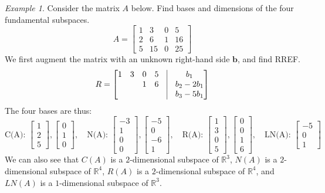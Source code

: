 \documentclass[11pt,oneside]{amsbook}
\newcommand{\R}{\mathbb R}
\theoremstyle{definition}
\theoremstyle{plain}
\theoremstyle{definition}
\theoremstyle{remark}
\newtheorem{example}[theorem]{Example}
\numberwithin{equation}{section}
\numberwithin{figure}{section}
\begin{document}
\begin{example}
  Consider the matrix $A$ below. Find bases and dimensions of the four fundamental subspaces.
  \[A=\begin{bmatrix}
      1&3&0&5\\2&6&1&16\\5&15&0&25
    \end{bmatrix}
  \]
  We first augment the matrix with an unknown right-hand side $\mathbf{b}$, and find RREF.
  \[R=\begin{bmatrix}
    1&3&0&5&\vline&b_1\\
    &&1&6&\vline&b_2-2b_1\\
    &&&&\vline&b_3-5b_1
    \end{bmatrix}
  \]
  The four bases are thus:
  \[\text{C(A): }\begin{bmatrix}1\\2\\5\end{bmatrix},
    \begin{bmatrix}0\\1\\0\end{bmatrix},\quad
    \text{N(A): }\begin{bmatrix}-3\\1\\0\\0\end{bmatrix},
    \begin{bmatrix}-5\\0\\-6\\1\end{bmatrix},\quad
    \text{R(A): }\begin{bmatrix}1\\3\\0\\5\end{bmatrix},
    \begin{bmatrix}0\\0\\1\\6\end{bmatrix},\quad
    \text{LN(A): }\begin{bmatrix}-5\\0\\1\end{bmatrix}
  \]
  We can also see that $C(A)$ is a $2$-dimensional subspace of $\R^3$, $N(A)$ is a $2$-dimensional subspace of $\R^4$, $R(A)$ is a $2$-dimensional subspace of $\R^4$, and $LN(A)$ is a $1$-dimensional subspace of $\R^3$.
\end{example}
\end{document}
